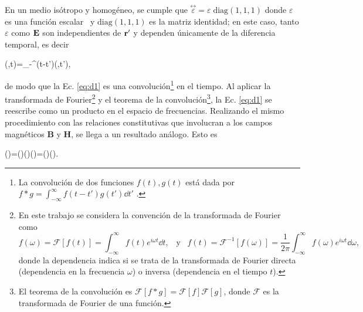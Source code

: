 En un medio isótropo y homogéneo, se cumple que $\stackrel{\leftrightarrow}{\varepsilon} = \varepsilon\; \text{diag}(1,1,1)$ donde $\varepsilon$ es una función escalar~\cite{jacksonClassicalElectrodynamics2021} y $\text{diag}(1,1,1)$ es la matriz identidad; en este caso, tanto $\varepsilon$ como $\vb{E}$ son independientes de $\vb{r}'$ y dependen únicamente de la diferencia temporal, es decir \cite{jacksonClassicalElectrodynamics2021}
%
\begin{tcolorbox}
	(,t)=\int_{-\infty}^{\infty}\varepsilon(t-t')(,t'),
	\label{eq:d1} 
\end{tcolorbox}
%	
%
%
\noindent de modo que la Ec. \eqref{eq:d1} es una convolución\footnote{La convolución de dos funciones $f(t), g(t)$ está dada por $f\ast g=\int_{-\infty}^{\infty}f(t-t')g(t')\dd{t'}$ \cite{arfkenMathematicalMethodsPhysicists2011}.} en el tiempo. Al aplicar la transformada de Fourier\footnote{En este trabajo se considera la convención de la transformada de Fourier como \cite{arfkenMathematicalMethodsPhysicists2011}
	\begin{equation*}
		f(\omega)=\mathscr{F}[f(t)]=\int_{-\infty}^{\infty}f(t)e^{i\omega t}\dd{t},\;\;\; \text{y}\;\;\; f(t)=\mathscr{F}^{-1}[f(\omega)]=\frac{1}{2\pi}\int_{-\infty}^{\infty}f(\omega)e^{i\omega t}\dd{\omega},
	\end{equation*} 
	donde la dependencia indica si se trata de la transformada de Fourier directa (dependencia en la frecuencia $\omega$) o inversa (dependencia en el tiempo $t$).} y el teorema de la convolución\footnote{El teorema de la convolución es $\mathscr{F}[f\ast g]=\mathscr{F}[f]\mathscr{F}[g]$, donde $\mathscr{F}$ es la transformada de Fourier de una función. }, la Ec. \eqref{eq:d1} se reescribe como un producto en el espacio de frecuencias. Realizando el mismo procedimiento con las relaciones constitutivas que involucran a los campos magnéticos $\mathbf{B}$ y $\mathbf{H}$, se llega a un resultado análogo. Esto es \cite{bohrenAbsorptionScatteringLight2008}
%
\begin{tcolorbox}
		(\omega)=\varepsilon(\omega)(\omega)\hspace{2cm}\hspace{2cm}(\omega)=\mu(\omega)(\omega).
	\label{eq:d3_b3} 
\end{tcolorbox}
